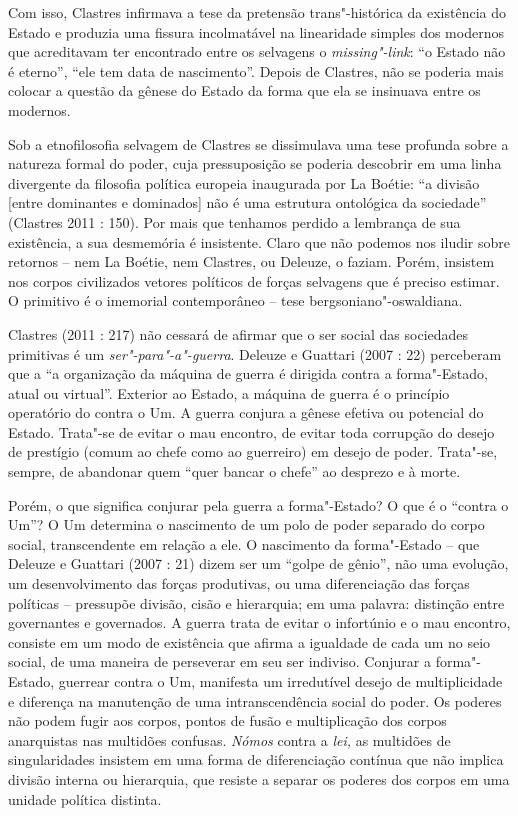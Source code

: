 Com isso, Clastres infirmava a tese da pretensão trans"-histórica da
existência do Estado e produzia uma fissura incolmatável na linearidade
simples dos modernos que acreditavam ter encontrado entre os selvagens o
\emph{missing"-link}: ``o Estado não é eterno'', ``ele tem data de
nascimento''. Depois de Clastres, não se poderia mais colocar a questão
da gênese do Estado da forma que ela se insinuava entre os modernos.

Sob a etnofilosofia selvagem de Clastres se dissimulava uma tese
profunda sobre a natureza formal do poder, cuja pressuposição se poderia
descobrir em uma linha divergente da filosofia política europeia
inaugurada por La Boétie: ``a divisão {[}entre dominantes e dominados{]}
não é uma estrutura ontológica da sociedade'' (Clastres 2011 : 150). Por
mais que tenhamos perdido a lembrança de sua existência, a sua
desmemória é insistente. Claro que não podemos nos iludir sobre retornos
-- nem La Boétie, nem Clastres, ou Deleuze, o faziam. Porém, insistem
nos corpos civilizados vetores políticos de forças selvagens que é
preciso estimar. O primitivo é o imemorial contemporâneo -- tese
bergsoniano"-oswaldiana.

Clastres (2011 : 217) não cessará de afirmar que o ser social das
sociedades primitivas é um \emph{ser"-para"-a"-guerra}. Deleuze e Guattari
(2007 : 22) perceberam que a ``a organização da máquina de guerra é
dirigida contra a forma"-Estado, atual ou virtual''. Exterior ao Estado,
a máquina de guerra é o princípio operatório do contra o Um. A guerra
conjura a gênese efetiva ou potencial do Estado. Trata"-se de evitar o
mau encontro, de evitar toda corrupção do desejo de prestígio (comum ao
chefe como ao guerreiro) em desejo de poder. Trata"-se, sempre, de
abandonar quem ``quer bancar o chefe'' ao desprezo e à morte.

Porém, o que significa conjurar pela guerra a forma"-Estado? O que é o
``contra o Um''? O Um determina o nascimento de um polo de poder
separado do corpo social, transcendente em relação a ele. O nascimento
da forma"-Estado -- que Deleuze e Guattari (2007 : 21) dizem ser um
``golpe de gênio'', não uma evolução, um desenvolvimento das forças
produtivas, ou uma diferenciação das forças políticas -- pressupõe
divisão, cisão e hierarquia; em uma palavra: distinção entre governantes
e governados. A guerra trata de evitar o infortúnio e o mau encontro,
consiste em um modo de existência que afirma a igualdade de cada um no
seio social, de uma maneira de perseverar em seu ser indiviso. Conjurar
a forma"-Estado, guerrear contra o Um, manifesta um irredutível desejo de
multiplicidade e diferença na manutenção de uma intranscendência social
do poder. Os poderes não podem fugir aos corpos, pontos de fusão e
multiplicação dos corpos anarquistas nas multidões confusas. \emph{Nómos
}contra a \emph{lei, }as multidões de singularidades insistem em uma
forma de diferenciação contínua que não implica divisão interna ou
hierarquia, que resiste a separar os poderes dos corpos em uma unidade
política distinta.

